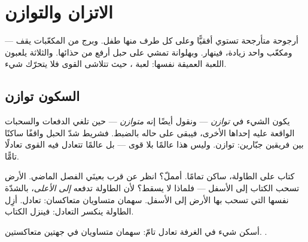 \chapter{الاتزان والتوازن}\label{ch:g2:balance-equilibrium}

أرجوحة متأرجحة تستوي أفقيًّا وعلى كل طرف منها طفل. وبرج من
المكعّبات يقف --- ومكعّب واحد زيادة، فينهار. وبهلوانة تمشي على
حبل أرفع من حذائها. والثلاثة يلعبون اللعبة العميقة نفسها: لعبة
، حيث تتلاشى القوى فلا يتحرّك شيء.

\section{السكون توازن}

\begin{definition}[التوازن]\label{def:g2:balance-equilibrium:equilibrium}
يكون الشيء في \emph{توازن} --- ونقول أيضًا إنه
\emph{متوازن} --- حين تلغي الدفعات والسحبات الواقعة
عليه إحداها الأخرى، فيبقى على حاله بالضبط. فشريط شدّ الحبل واقفًا
ساكنًا بين فريقين جبّارين: توازن. وليس هذا عالمًا بلا قوى ---
بل عالمًا تتعادل فيه القوى تعادلًا تامًّا.
\end{definition}

\begin{example}\label{ex:g2:balance-equilibrium:book}
كتاب على الطاولة، ساكن تمامًا. أمملّ؟ انظر عن قرب بعينَي الفصل
الماضي. الأرض تسحب الكتاب إلى الأسفل --- فلماذا لا يسقط؟ لأن
الطاولة تدفعه \emph{إلى الأعلى}، بالشدّة نفسها التي تسحب بها
الأرض إلى الأسفل. سهمان متساويان متعاكسان: تعادل. أزِل الطاولة
ينكسر التعادل: فينزل الكتاب.
\end{example}

\begin{omfigure}

{\small أسكن شيء في الغرفة تعادل تامّ: سهمان متساويان في جهتين
متعاكستين. .}
\end{omfigure}

